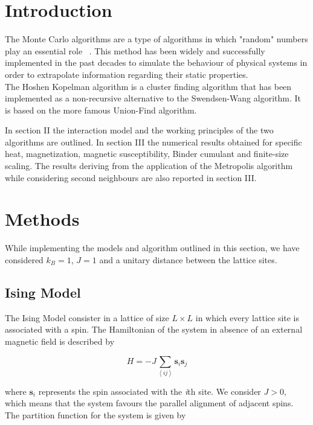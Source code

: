 \documentclass[twoside]{article}
\def\mean#1{\left< #1 \right>}
\begin{document}
\begin{multicols}{2} %

\section{Introduction}
The Monte Carlo algorithms are a type of algorithms in which "random" numbers play an essential role ~\cite{thijssen}. This method has been widely and successfully implemented in the past decades to simulate the behaviour of physical systems in order to extrapolate information regarding their static properties. \\
The Hoshen Kopelman algorithm is a cluster finding algorithm that has been implemented as a non-recursive alternative to the Swendsen-Wang algorithm. It is based on the more famous Union-Find algorithm.

In section II the interaction model and the working principles of the two algorithms are outlined. In section III the numerical results obtained for specific heat, magnetization, magnetic susceptibility, Binder cumulant and finite-size scaling. The results deriving from the application of the Metropolis algorithm while considering second neighbours are also reported in section III.


\section{Methods}
While implementing the models and algorithm outlined in this section, we have considered $k_B = 1$, $J = 1$ and a unitary distance between the lattice sites.

\subsection{Ising Model}
The Ising Model consister in a lattice of size $L \times L$ in which every lattice site is associated with a spin. The Hamiltonian of the system in absence of an external magnetic field is described by

\begin{equation}
H = - J \sum_{\mean{ij}} \textbf{s}_i \textbf{s}_j
\end{equation}

where $\textbf{s}_i$ represents the spin associated with the \emph{i}th site.
We consider $J > 0$, which means that the system favours the parallel alignment of adjacent spins.
The partition function for the system is given by 


\end{multicols}
\end{document}
